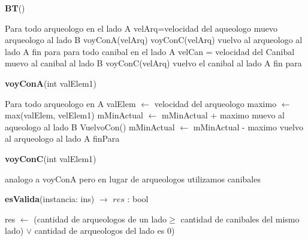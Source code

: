 \documentclass[spanish,12pt]{article}
\begin{document}
\begin{algorithm}[H]{\textbf{BT}() }
	\begin{algorithmic}
		\State Para todo arqueologo en el lado A
		\State \quad  velArq=velocidad del aqueologo
		\State \quad muevo arqueologo al lado B
		\State \quad voyConA(velArq)
		\State \quad voyConC(velArq)
		\State \quad vuelvo al arqueologo al lado A
		\State fin para
		\State para todo canibal en el lado A
		\State \quad velCan = velocidad del Canibal
		\State \quad muevo al canibal al lado B
		\State \quad voyConC(velArq)
		\State \quad  vuelvo el canibal al lado A
		\State fin para
	\end{algorithmic}
\end{algorithm}

\begin{algorithm}[H]{\textbf{voyConA}(int valElem1)}
	\begin{algorithmic}
	\State Para todo arqueologo en A
	\State \qquad valElem $\gets$ velocidad del arqueologo
	\State \qquad maximo $\gets$ max(valElem, velElem1)
	\State \qquad mMinActual $\gets$ mMinActual + maximo
	\State \qquad muevo al aqueologo al lado B
	\State \qquad VuelvoCon()
	\State \qquad mMinActual $\gets$ mMinActual - maximo
	\State \qquad vuelvo al arqueologo al lado A	
	\State finPara
	\end{algorithmic}
\end{algorithm}

\begin{algorithm}[H]{\textbf{voyConC}(int valElem1)}
	\begin{algorithmic}
		\State  analogo a voyConA pero en lugar de arqueologos utilizamos canibales
	\end{algorithmic}
\end{algorithm}
 	
\begin{algorithm}[H]{\textbf{esValida}(instancia: ins) $\to$ $res$ : bool }
	\begin{algorithmic}
	 res $\gets$ (cantidad de arqueologos de un lado$\geq$ cantidad de canibales del mismo lado) $\lor$ cantidad de arqueologos del lado es 0)
	\end{algorithmic}
\end{algorithm}
\end{document}
